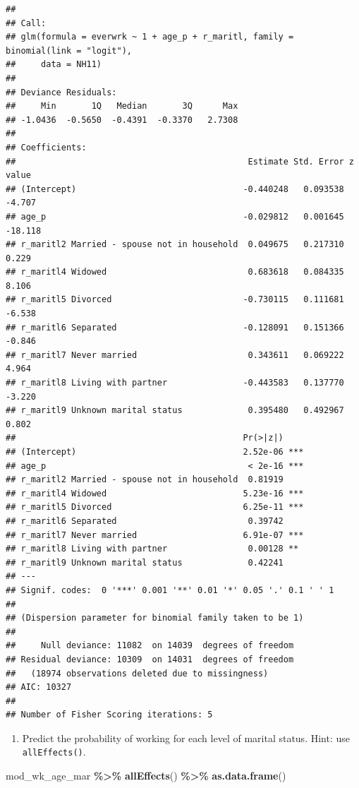 \documentclass[
]{book}
\newenvironment{Shaded}{\begin{snugshade}}{\end{snugshade}}
\newcommand{\KeywordTok}[1]{\textcolor[rgb]{0.13,0.29,0.53}{\textbf{#1}}}
\newcommand{\NormalTok}[1]{#1}
\newcommand{\OperatorTok}[1]{\textcolor[rgb]{0.81,0.36,0.00}{\textbf{#1}}}
\newcommand{\StringTok}[1]{\textcolor[rgb]{0.31,0.60,0.02}{#1}}
\providecommand{\tightlist}{%
  \setlength{\itemsep}{0pt}\setlength{\parskip}{0pt}}
\begin{document}
\begin{alert}
\begin{verbatim}
## 
## Call:
## glm(formula = everwrk ~ 1 + age_p + r_maritl, family = binomial(link = "logit"), 
##     data = NH11)
## 
## Deviance Residuals: 
##     Min       1Q   Median       3Q      Max  
## -1.0436  -0.5650  -0.4391  -0.3370   2.7308  
## 
## Coefficients:
##                                              Estimate Std. Error z value
## (Intercept)                                 -0.440248   0.093538  -4.707
## age_p                                       -0.029812   0.001645 -18.118
## r_maritl2 Married - spouse not in household  0.049675   0.217310   0.229
## r_maritl4 Widowed                            0.683618   0.084335   8.106
## r_maritl5 Divorced                          -0.730115   0.111681  -6.538
## r_maritl6 Separated                         -0.128091   0.151366  -0.846
## r_maritl7 Never married                      0.343611   0.069222   4.964
## r_maritl8 Living with partner               -0.443583   0.137770  -3.220
## r_maritl9 Unknown marital status             0.395480   0.492967   0.802
##                                             Pr(>|z|)    
## (Intercept)                                 2.52e-06 ***
## age_p                                        < 2e-16 ***
## r_maritl2 Married - spouse not in household  0.81919    
## r_maritl4 Widowed                           5.23e-16 ***
## r_maritl5 Divorced                          6.25e-11 ***
## r_maritl6 Separated                          0.39742    
## r_maritl7 Never married                     6.91e-07 ***
## r_maritl8 Living with partner                0.00128 ** 
## r_maritl9 Unknown marital status             0.42241    
## ---
## Signif. codes:  0 '***' 0.001 '**' 0.01 '*' 0.05 '.' 0.1 ' ' 1
## 
## (Dispersion parameter for binomial family taken to be 1)
## 
##     Null deviance: 11082  on 14039  degrees of freedom
## Residual deviance: 10309  on 14031  degrees of freedom
##   (18974 observations deleted due to missingness)
## AIC: 10327
## 
## Number of Fisher Scoring iterations: 5
\end{verbatim}

\begin{enumerate}
\def\labelenumi{\arabic{enumi}.}
\setcounter{enumi}{1}
\tightlist
\item
  Predict the probability of working for each level of marital status. Hint: use \texttt{allEffects()}.
\end{enumerate}

\begin{Shaded}
\begin{Highlighting}[]
\NormalTok{  mod\_wk\_age\_mar }\OperatorTok{\%\textgreater{}\%}\StringTok{ }
\StringTok{      }\KeywordTok{allEffects}\NormalTok{() }\OperatorTok{\%\textgreater{}\%}
\StringTok{      }\KeywordTok{as.data.frame}\NormalTok{()}
\end{Highlighting}
\end{Shaded}


\end{alert}
\end{document}
